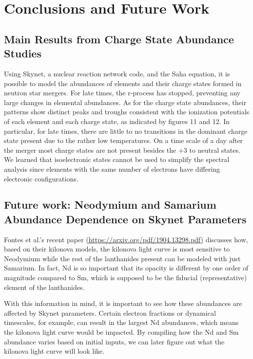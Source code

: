 \documentclass[11pt,a4paper]{article}
\begin{document}
\section{Conclusions and Future Work}

\subsection{Main Results from Charge State Abundance Studies}

Using Skynet, a nuclear reaction network code, and the Saha equation, it is possible to model the abundances of elements and their charge states formed in neutron star mergers. For late times, the r-process has stopped, preventing any large changes in elemental abundances. As for the charge state abundances, their patterns show distinct peaks and troughs consistent with the ionization potentials of each element and each charge state, as indicated by figures 11 and 12. 
In particular, for late times, there are little to no transitions in the dominant charge state present due to the rather low temperatures. On a time scale of a day after the merger most charge states are not present besides the +3 to neutral states. 
We learned that isoelectronic states cannot be used to simplify the spectral analysis since elements with the same number of electrons have differing electronic configurations. \\

\subsection{Future work: Neodymium and Samarium Abundance Dependence on Skynet Parameters}

Fontes et al.'s recent paper \url{(https://arxiv.org/pdf/1904.13298.pdf)} discusses how, based on their kilonova models, the kilonova light curve is most sensitive to Neodymium while the rest of the lanthanides present can be modeled with just Samarium. In fact, Nd is so important that its opacity is different by one order of magnitude compared to Sm, which is supposed to be the fiducial (representative) element of the lanthanides. 

With this information in mind, it is important to see how these abundances are affected by Skynet parameters. Certain electron fractions or dynamical timescales, for example, can result in the largest Nd abundances, which means the kilonova light curve would be impacted. By compiling how the Nd and Sm abundance varies based on initial inputs, we can later figure out what the kilonova light curve will look like. 
\end{document}
